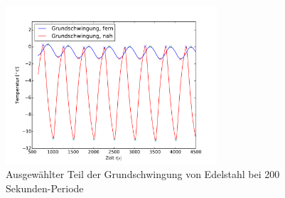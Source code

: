 \begin{figure}[h!]
	\centering
	\includegraphics[width=0.7\textwidth]{Bilder/M3_Edelstahl_norm.pdf}
	\caption{Ausgewählter Teil der Grundschwingung von Edelstahl bei 200 Sekunden-Periode}
	\label{fig:M3EdelstahlNormkurve}
\end{figure}
